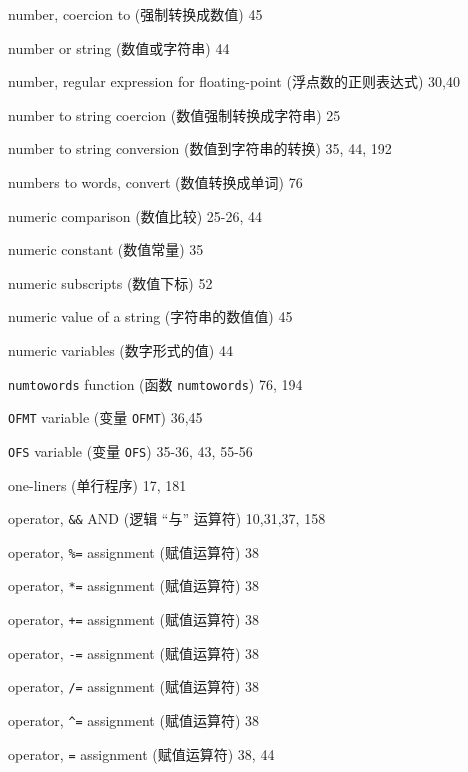 \begin{multicols}{2}
\hangindent=2pc  number, coercion to (强制转换成数值) 45

\hangindent=2pc  number or string (数值或字符串) 44

\hangindent=2pc  number, regular expression for floating-point
(浮点数的正则表达式) 30,40

\hangindent=2pc  number to string coercion
(数值强制转换成字符串) 25

\hangindent=2pc  number to string conversion (数值到字符串的转换)
35,  44, 192

\hangindent=2pc  numbers to words, convert (数值转换成单词) 76

\hangindent=2pc  numeric comparison (数值比较) 25-26, 44

\hangindent=2pc  numeric constant (数值常量) 35

\hangindent=2pc  numeric subscripts (数值下标) 52

\hangindent=2pc  numeric value of a string (字符串的数值值) 45

\hangindent=2pc  numeric variables (数字形式的值) 44

\hangindent=2pc  \verb'numtowords' function (函数
\verb'numtowords') 76, 194

\hangindent=2pc  \verb'OFMT' variable (变量 \verb'OFMT') 36,45

\hangindent=2pc  \verb'OFS' variable (变量 \verb'OFS')
35-36, 43, 55-56

\hangindent=2pc  one-liners (单行程序) 17, 181

\hangindent=2pc  operator, \verb'&&' AND (逻辑 ``与'' 运算符)
10,31,37, 158

\hangindent=2pc  operator, \verb'%=' assignment (赋值运算符) 38

\hangindent=2pc  operator, \verb'*=' assignment (赋值运算符) 38

\hangindent=2pc  operator, \verb'+=' assignment (赋值运算符) 38

\hangindent=2pc  operator, \verb'-=' assignment (赋值运算符) 38

\hangindent=2pc  operator, \verb'/=' assignment (赋值运算符) 38

\hangindent=2pc  operator, \verb'^=' assignment (赋值运算符) 38

\hangindent=2pc  operator, \verb'=' assignment (赋值运算符) 38, 44


\end{multicols}
